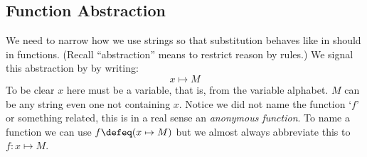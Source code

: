 
\subsection{Function Abstraction}
We need to narrow how we use strings so that substitution behaves 
like in should in functions.  (Recall ``abstraction'' means to restrict reason by rules.)
We signal this abstraction by by writing:
\begin{equation}
    \tag{Function Abstraction}
    x  \mapsto M
\end{equation}
To be clear $x$ here must be a variable, that is, from the variable 
alphabet.  $M$ can be any string even one not containing $x$.
Notice we did not  name the function `$f$' or something related, 
this is in a real sense an \emph{anonymous function}.  To 
name a function we can use $f\defeq (x\mapsto M)$ 
but we almost always abbreviate this to $f:x\mapsto M$.

